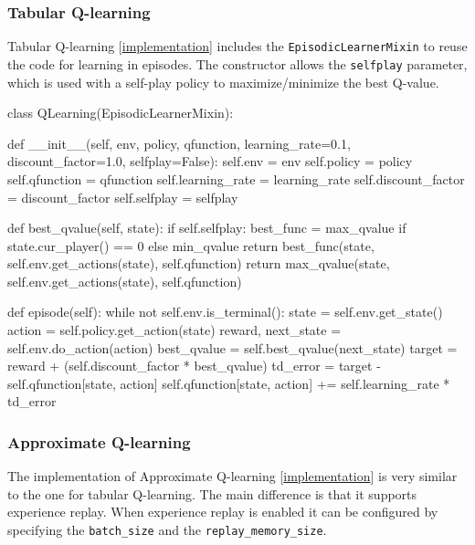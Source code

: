 \documentclass{article}
\newcommand{\GithubURL}[1]{[\href{https://github.com/davidrobles/mlnd-capstone-code/blob/master/#1}{implementation}]}
\begin{document}
\subsubsection{Tabular Q-learning}

Tabular Q-learning \GithubURL{capstone/rl/learners/qlearning.py} includes the
\texttt{EpisodicLearnerMixin} to reuse the code for learning in episodes. The constructor allows the
\texttt{selfplay} parameter, which is used with a self-play policy to maximize/minimize the best
Q-value.

\begin{python}
class QLearning(EpisodicLearnerMixin):

    def __init__(self, env, policy, qfunction, learning_rate=0.1,
                 discount_factor=1.0, selfplay=False):
        self.env = env
        self.policy = policy
        self.qfunction = qfunction
        self.learning_rate = learning_rate
        self.discount_factor = discount_factor
        self.selfplay = selfplay

    def best_qvalue(self, state):
        if self.selfplay:
            best_func = max_qvalue if state.cur_player() == 0 else min_qvalue
            return best_func(state, self.env.get_actions(state), self.qfunction)
        return max_qvalue(state, self.env.get_actions(state), self.qfunction)

    def episode(self):
        while not self.env.is_terminal():
            state = self.env.get_state()
            action = self.policy.get_action(state)
            reward, next_state = self.env.do_action(action)
            best_qvalue = self.best_qvalue(next_state)
            target = reward + (self.discount_factor * best_qvalue)
            td_error = target - self.qfunction[state, action]
            self.qfunction[state, action] += self.learning_rate * td_error
\end{python}

\subsubsection{Approximate Q-learning}

The implementation of Approximate Q-learning \GithubURL{capstone/rl/learners/qlearning_approx.py} is
very similar to the one for tabular \mbox{Q-learning}. The main difference is that it supports
experience replay. When experience replay is enabled it can be configured by specifying the
\texttt{batch\_size} and the \texttt{replay\_memory\_size}.
\end{document}
